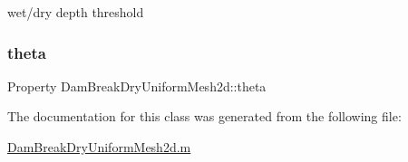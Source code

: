 wet/dry depth threshold 

\mbox{\label{class_dam_break_dry_uniform_mesh2d_a9081a911c9c984f7f7ce43963ff2758c}} 
\subsubsection{\texorpdfstring{theta}{theta}}
{\footnotesize\ttfamily Property Dam\+Break\+Dry\+Uniform\+Mesh2d\+::theta\hspace{0.3cm}{\ttfamily [protected]}}



The documentation for this class was generated from the following file\+:\begin{DoxyCompactItemize}
\item 
\hyperlink{_dam_break_dry_uniform_mesh2d_8m}{Dam\+Break\+Dry\+Uniform\+Mesh2d.\+m}\end{DoxyCompactItemize}
